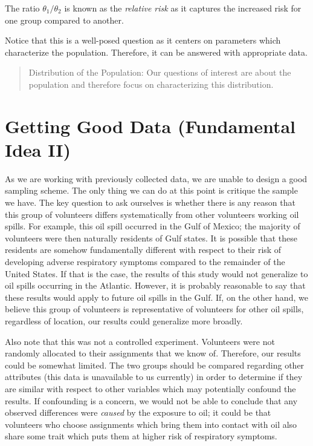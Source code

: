 \documentclass[
  letterpaper,
  DIV=11,
  numbers=noendperiod]{scrreprt}
\theoremstyle{plain}
\theoremstyle{definition}
\theoremstyle{definition}
\theoremstyle{remark}
\begin{document}
The ratio \(\theta_1/\theta_2\) is known as the \emph{relative risk} as
it captures the increased risk for one group compared to another.

Notice that this is a well-posed question as it centers on parameters
which characterize the population. Therefore, it can be answered with
appropriate data.

\begin{quote}
Distribution of the Population: Our questions of interest are about the
population and therefore focus on characterizing this distribution.
\end{quote}

\hypertarget{getting-good-data-fundamental-idea-ii}{%
\section{Getting Good Data (Fundamental Idea
II)}\label{getting-good-data-fundamental-idea-ii}}

As we are working with previously collected data, we are unable to
design a good sampling scheme. The only thing we can do at this point is
critique the sample we have. The key question to ask ourselves is
whether there is any reason that this group of volunteers differs
systematically from other volunteers working oil spills. For example,
this oil spill occurred in the Gulf of Mexico; the majority of
volunteers were then naturally residents of Gulf states. It is possible
that these residents are somehow fundamentally different with respect to
their risk of developing adverse respiratory symptoms compared to the
remainder of the United States. If that is the case, the results of this
study would not generalize to oil spills occurring in the Atlantic.
However, it is probably reasonable to say that these results would apply
to future oil spills in the Gulf. If, on the other hand, we believe this
group of volunteers is representative of volunteers for other oil
spills, regardless of location, our results could generalize more
broadly.

Also note that this was not a controlled experiment. Volunteers were not
randomly allocated to their assignments that we know of. Therefore, our
results could be somewhat limited. The two groups should be compared
regarding other attributes (this data is unavailable to us currently) in
order to determine if they are similar with respect to other variables
which may potentially confound the results. If confounding is a concern,
we would not be able to conclude that any observed differences were
\emph{caused} by the exposure to oil; it could be that volunteers who
choose assignments which bring them into contact with oil also share
some trait which puts them at higher risk of respiratory symptoms.
\end{document}
